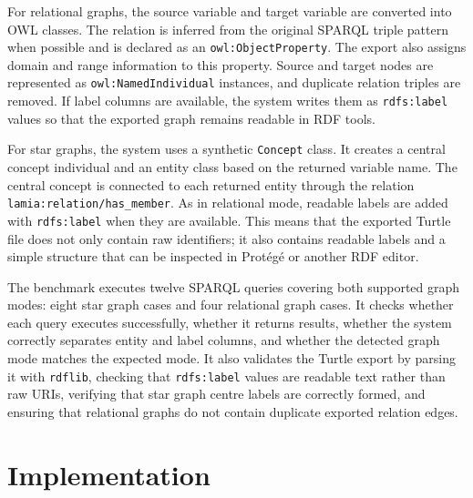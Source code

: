 \documentclass[11pt,a4paper]{article}
\begin{document}
For relational graphs, the source variable and target variable are converted into OWL classes. The relation is inferred from the original SPARQL triple pattern when possible and is declared as an \texttt{owl:ObjectProperty}. The export also assigns domain and range information to this property. Source and target nodes are represented as \texttt{owl:NamedIndividual} instances, and duplicate relation triples are removed. If label columns are available, the system writes them as \texttt{rdfs:label} values so that the exported graph remains readable in RDF tools.

For star graphs, the system uses a synthetic \texttt{Concept} class. It creates a central concept individual and an entity class based on the returned variable name. The central concept is connected to each returned entity through the relation \texttt{lamia:relation/has\_member}. As in relational mode, readable labels are added with \texttt{rdfs:label} when they are available. This means that the exported Turtle file does not only contain raw identifiers; it also contains readable labels and a simple structure that can be inspected in Prot\'eg\'e or another RDF editor.

The benchmark executes twelve SPARQL queries covering both supported graph modes: eight star graph cases and four relational graph cases. It checks whether each query executes successfully, whether it returns results, whether the system correctly separates entity and label columns, and whether the detected graph mode matches the expected mode. It also validates the Turtle export by parsing it with \texttt{rdflib}, checking that \texttt{rdfs:label} values are readable text rather than raw URIs, verifying that star graph centre labels are correctly formed, and ensuring that relational graphs do not contain duplicate exported relation edges.


\section{Implementation}
\label{sec:implementation}
\end{document}
